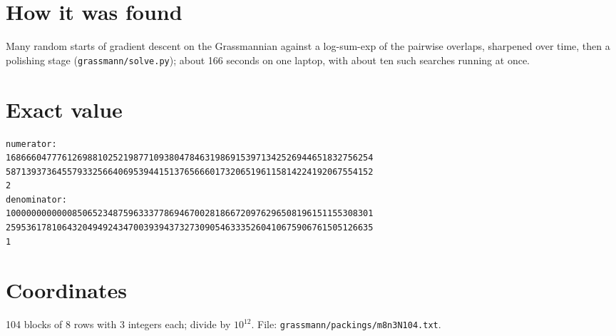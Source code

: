 \documentclass[11pt,a4paper]{article}
\begin{document}
\section{How it was found}
Many random starts of gradient descent on the Grassmannian against a log-sum-exp of the pairwise overlaps, sharpened over time, then a polishing stage (\texttt{grassmann/solve.py}); about 166 seconds on one laptop, with about ten such searches running at once.


\appendix
\section{Exact value}
{\small
\begin{verbatim}
numerator:
168666047776126988102521987710938047846319869153971342526944651832756254
587139373645579332566406953944151376566601732065196115814224192067554152
2
denominator:
100000000000085065234875963337786946700281866720976296508196151155308301
259536178106432049492434700393943732730905463335260410675906761505126635
1
\end{verbatim}}

\section{Coordinates}
104 blocks of 8 rows with 3 integers each; divide by $10^{12}$. File: \texttt{grassmann/packings/m8n3N104.txt}.
{\tiny
\begin{multicols}{3}
\end{multicols}}
\end{document}
